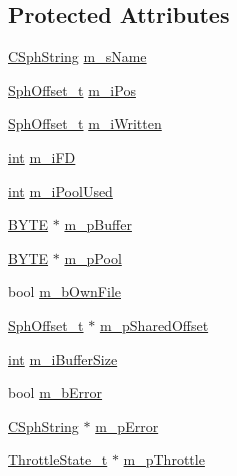 \subsection*{Protected Attributes}
\begin{DoxyCompactItemize}
\item 
\hyperlink{structCSphString}{C\-Sph\-String} \hyperlink{classCSphWriter_a462ad0ec99a0a463dc2f0b8bda154c37}{m\-\_\-s\-Name}
\item 
\hyperlink{sphinx_8h_a0fb3b64afebef33c61367714754eaa90}{Sph\-Offset\-\_\-t} \hyperlink{classCSphWriter_ac4192cd2815a3ecfe211ffa016b156d7}{m\-\_\-i\-Pos}
\item 
\hyperlink{sphinx_8h_a0fb3b64afebef33c61367714754eaa90}{Sph\-Offset\-\_\-t} \hyperlink{classCSphWriter_af31ade40cfe477a83fd94131488a4601}{m\-\_\-i\-Written}
\item 
\hyperlink{sphinxexpr_8cpp_a4a26e8f9cb8b736e0c4cbf4d16de985e}{int} \hyperlink{classCSphWriter_a49ea3c2c72312bc5133cb8f93043ee61}{m\-\_\-i\-F\-D}
\item 
\hyperlink{sphinxexpr_8cpp_a4a26e8f9cb8b736e0c4cbf4d16de985e}{int} \hyperlink{classCSphWriter_ab073ccb1cd18e73f0f60e136ec5ca05d}{m\-\_\-i\-Pool\-Used}
\item 
\hyperlink{sphinxstd_8h_a4ae1dab0fb4b072a66584546209e7d58}{B\-Y\-T\-E} $\ast$ \hyperlink{classCSphWriter_a340ea2975deee4e74d794556a5a14b98}{m\-\_\-p\-Buffer}
\item 
\hyperlink{sphinxstd_8h_a4ae1dab0fb4b072a66584546209e7d58}{B\-Y\-T\-E} $\ast$ \hyperlink{classCSphWriter_abbb485d6e77f4c5bc57672de79606b9c}{m\-\_\-p\-Pool}
\item 
bool \hyperlink{classCSphWriter_a32b6f0e63ecc8fd965302591620337b2}{m\-\_\-b\-Own\-File}
\item 
\hyperlink{sphinx_8h_a0fb3b64afebef33c61367714754eaa90}{Sph\-Offset\-\_\-t} $\ast$ \hyperlink{classCSphWriter_a294466e5763d07e3bdcab322bb326495}{m\-\_\-p\-Shared\-Offset}
\item 
\hyperlink{sphinxexpr_8cpp_a4a26e8f9cb8b736e0c4cbf4d16de985e}{int} \hyperlink{classCSphWriter_a2819349d330569d22f9db5189cec062b}{m\-\_\-i\-Buffer\-Size}
\item 
bool \hyperlink{classCSphWriter_ae2c5a7a72b7fee79f8ec253e0907aaf9}{m\-\_\-b\-Error}
\item 
\hyperlink{structCSphString}{C\-Sph\-String} $\ast$ \hyperlink{classCSphWriter_a92d14a1ae7105b101026fa8cb475a964}{m\-\_\-p\-Error}
\item 
\hyperlink{structThrottleState__t}{Throttle\-State\-\_\-t} $\ast$ \hyperlink{classCSphWriter_a7a3c2e9afb46c10678157fd4946e538c}{m\-\_\-p\-Throttle}
\end{DoxyCompactItemize}

